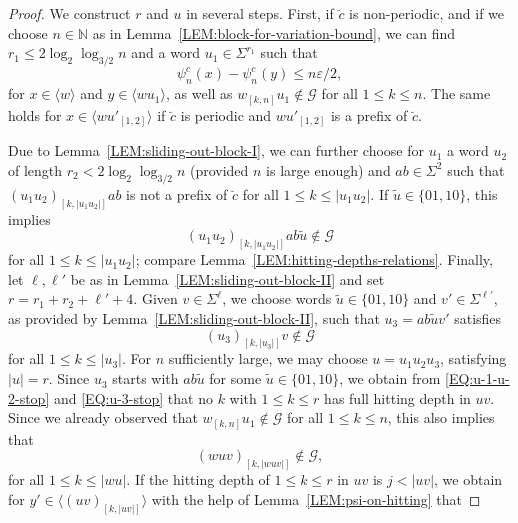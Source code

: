 \documentclass[11pt,reqno]{amsart}
\theoremstyle{plain}
\theoremstyle{definition}
\newcommand{\N}{{\mathbb N}}
\newcommand{\mc}{\mathcal}
\begin{document}
\begin{proof}
We construct $r$ and $u$ in several steps. First, if $\breve{c}$ is non-periodic, and if we choose $n\in \N$ as in Lemma~\ref{LEM:block-for-variation-bound}, we can find $r_1 \leqslant 2\log_2 \log_{3/2} n$ and a word $u_1 \in \Sigma^{r_1}$ such that
\begin{equation}
\label{EQ:big-block-variation}
\psi^c_n(x) - \psi^c_n(y) \leqslant n \varepsilon /2,
\end{equation}
for $x \in \langle w \rangle$ and $y \in \langle wu_1 \rangle$, as well as $w_{[k,n]}u_1 \notin \mc G$ for all $1 \leqslant k \leqslant n$.
The same holds for $x \in \langle wu'_{[1,2]} \rangle$ if $\breve{c}$ is periodic and $wu'_{[1,2]}$ is a prefix of $\breve{c}$. 

Due to Lemma~\ref{LEM:sliding-out-block-I}, we can further choose for $u_1$ a word $u_2$ of length $r_2 < 2\log_2 \log_{3/2} n$
(provided $n$ is large enough) and $ab \in \Sigma^2$ such that $(u_1 u_2)_{[k,|u_1 u_2|]}ab$ is not a prefix of $\breve{c}$ for all $1\leqslant k \leqslant |u_1 u_2|$. 
If $\widetilde{u} \in \{01,10\}$, this implies
\begin{equation}
\label{EQ:u-1-u-2-stop}
(u_1 u_2)_{[k,|u_1 u_2|]}ab \widetilde{u} \notin \mc G
\end{equation} 
for all $1 \leqslant k \leqslant |u_1 u_2|$; compare Lemma~\ref{LEM:hitting-depths-relations}.
Finally, let $\ell, \ell'$ be as in Lemma~\ref{LEM:sliding-out-block-II} and set $r = r_1 + r_2 + \ell' + 4$. Given $v \in \Sigma^{\ell}$, we choose words $\widetilde{u} \in \{01,10\}$ and $v' \in \Sigma^{\ell'}$, as provided by Lemma~\ref{LEM:sliding-out-block-II}, such that $u_3 = ab \widetilde{u} v'$ satisfies 
\begin{equation}
\label{EQ:u-3-stop}
(u_3)_{[k,|u_3| ]} v \notin \mc G
\end{equation}
for all $1\leqslant k \leqslant |u_3|$. For $n$ sufficiently large, we may choose $u = u_1 u_2 u_3$, satisfying $|u| = r$. 
 Since $u_3$ starts with $ab \widetilde{u}$ for some $\widetilde{u} \in \{01,10\}$, we obtain from \eqref{EQ:u-1-u-2-stop} and \eqref{EQ:u-3-stop} that no $k$ with $1\leqslant k \leqslant r$ has full hitting depth in $uv$. Since we already observed that $w_{[k,n]} u_1 \notin \mc G$ for all $1\leqslant k \leqslant n$, this also implies that
\[
(wuv)_{[k,|wuv|]} \notin \mc G,
\]
for all $1 \leqslant k \leqslant |wu|$.
If the hitting depth of $1\leqslant k \leqslant r$ in $uv$ is $j < |uv|$, we obtain for $y' \in \langle (uv)_{[k,|uv| ]}\rangle$ with the help of Lemma~\ref{LEM:psi-on-hitting} that

\end{proof}
\end{document}
